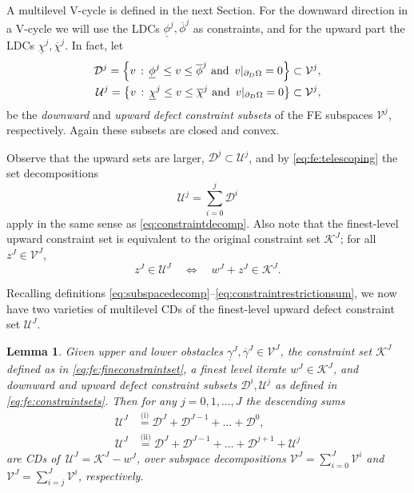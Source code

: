\documentclass[letterpaper,final,12pt,reqno]{amsart}
\theoremstyle{cstyle}
\newtheorem{lemma}[theorem]{Lemma}
\theoremstyle{cstyle*}
\theoremstyle{dstyle}
\numberwithin{equation}{section}
\numberwithin{figure}{section}
\numberwithin{table}{section}
\numberwithin{theorem}{section}
\newcommand{\cK}{\mathcal{K}}
\newcommand{\cV}{\mathcal{V}}
\begin{document}
A multilevel V-cycle is defined in the next Section.  For the downward direction in a V-cycle we will use the LDCs $\underline{\phi}^j,\overline{\phi}^j$ as constraints, and for the upward part the LDCs $\underline{\chi}^j,\overline{\chi}^j$.  In fact, let
\begin{align}
\mathcal{D}^j = \left\{v \,:\, \underline{\phi}^j \le v \le \overline{\phi}^j \text{ and } \, v|_{\partial_D\Omega} = 0\right\} \subset \mathcal{V}^j, \label{eq:fe:constraintsets} \\
\mathcal{U}^j = \left\{v\,:\, \underline{\chi}^j \le v \le \overline{\chi}^j \text{ and } \, v|_{\partial_D\Omega} = 0\right\} \subset \mathcal{V}^j, \notag
\end{align}
be the \emph{downward} and \emph{upward defect constraint subsets} of the FE subspaces $\mathcal{V}^j$, respectively.  Again these subsets are closed and convex.

Observe that the upward sets are larger, $\mathcal{D}^j \subset \mathcal{U}^j$, and by \eqref{eq:fe:telescoping} the set decompositions
\begin{equation}
\mathcal{U}^j = \sum_{i=0}^j \mathcal{D}^i \label{eq:fe:constraintdecomp}
\end{equation}
apply in the same sense as \eqref{eq:constraintdecomp}.  Also note that the finest-level upward constraint set is equivalent to the original constraint set $\mathcal{K}^J$; for all $z^J \in \mathcal{V}^J$,
\begin{equation}
z^J \in \mathcal{U}^J \quad \iff \quad w^J+z^J \in \mathcal{K}^J. \label{eq:fe:finestlevelequivalent}
\end{equation}

Recalling definitions \eqref{eq:subspacedecomp}--\eqref{eq:constraintrestrictionsum}, we now have two varieties of multilevel CDs of the finest-level upward defect constraint set $\mathcal{U}^J$.

\begin{lemma}  Given upper and lower obstacles $\underline{\gamma}^J,\overline{\gamma}^J \in \cV^J$, the constraint set $\cK^J$ defined as in \eqref{eq:fe:fineconstraintset}, a finest level iterate $w^J \in \cK^J$, and downward and upward defect constraint subsets $\mathcal{D}^i,\mathcal{U}^j$ as defined in \eqref{eq:fe:constraintsets}.  Then for any $j=0,1,\dots,J$ the descending sums
\begin{align}
\mathcal{U}^J &\stackrel{\text{(i)}}{=} \mathcal{D}^J + \mathcal{D}^{J-1} + \dots + \mathcal{D}^0, \label{eq:fe:downwardsumcd} \\
\mathcal{U}^J &\stackrel{\text{(ii)}}{=} \mathcal{D}^J + \mathcal{D}^{J-1} + \dots + \mathcal{D}^{j+1} + \mathcal{U}^j \label{eq:fe:upwardsumcd}
\end{align}
are CDs of\, $\mathcal{U}^J = \cK^J - w^J$, over subspace decompositions $\cV^J=\sum_{i=0}^J \cV^i$ and $\cV^J=\sum_{i=j}^J \cV^i$, respectively.
\end{lemma}
\end{document}

